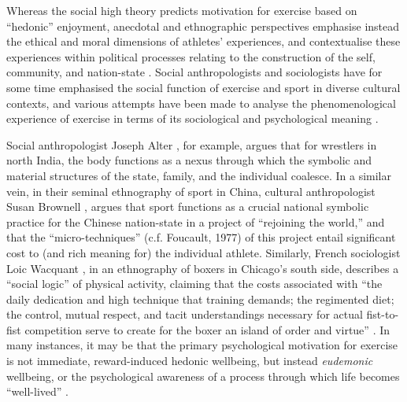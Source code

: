 \begin{CJK}{UTF8}{gbsn}
Whereas the social high theory predicts motivation for exercise based on ``hedonic'' enjoyment, anecdotal and ethnographic perspectives emphasise instead the ethical and moral dimensions of athletes' experiences, and contextualise these experiences within political processes relating to the construction of the self, community, and nation-state \citep{Alter1993,Brownell1995,Downey2005,Wacquant2004}.
Social anthropologists and sociologists have for some time emphasised the social function of exercise and sport in diverse cultural contexts, and various attempts have been made to analyse the phenomenological experience of exercise in terms of its sociological and psychological meaning \citep{Bourdieu1978}.

Social anthropologist Joseph Alter \textcite{Alter1993}, for example, argues that for wrestlers in north India, the body functions as a nexus through which the symbolic and material structures of the state, family, and the individual coalesce.  In a similar vein, in their seminal ethnography of sport in China, cultural anthropologist Susan Brownell \textcite{Brownell1995}, argues that sport functions as a crucial national symbolic practice for the Chinese nation-state in a project of ``rejoining the world,'' and that the ``micro-techniques'' (c.f. Foucault, 1977) of this project entail significant cost to (and rich meaning for) the individual athlete.   Similarly, French sociologist Loic Wacquant \textcite{Wacquant2004}, in an ethnography of boxers in Chicago's south side, describes a ``social logic'' of physical activity, claiming that the costs associated with ``the daily dedication and high technique that training demands; the regimented diet; the control, mutual respect, and tacit understandings necessary for actual fist-to-fist competition serve to create for the boxer an island of order and virtue'' \textcite[17]{Wacquant2004}. In many instances, it may be that the primary psychological motivation for exercise is not immediate, reward-induced hedonic wellbeing, but instead \textit{eudemonic} wellbeing, or the psychological awareness of a process through which life becomes ``well-lived'' \citep{Fave2009,Huta2013}.


\end{CJK}
